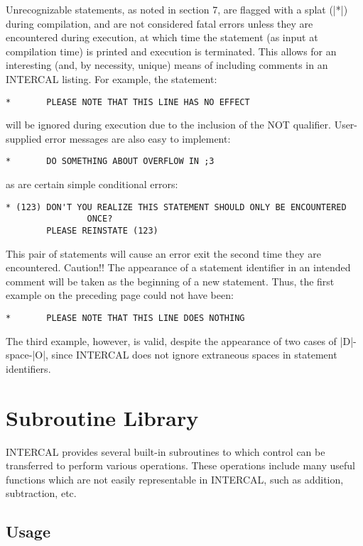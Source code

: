 Unrecognizable statements, as noted in section 7, are flagged with a splat
(|*|) during compilation, and are not considered fatal errors unless they
are encountered during execution, at which time the statement (as input at
compilation time) is printed and execution is terminated.  This allows for
an interesting (and, by necessity, unique) means of including comments in
an INTERCAL listing.  For example, the statement:

\begin{verbatim}
*       PLEASE NOTE THAT THIS LINE HAS NO EFFECT
\end{verbatim}
will be ignored during execution due to the inclusion of the NOT qualifier.
User-supplied error messages are also easy to implement:

\begin{verbatim}
*       DO SOMETHING ABOUT OVERFLOW IN ;3
\end{verbatim}
as are certain simple conditional errors:

\begin{verbatim}
* (123) DON'T YOU REALIZE THIS STATEMENT SHOULD ONLY BE ENCOUNTERED
                ONCE?
        PLEASE REINSTATE (123)
\end{verbatim}
This pair of statements will cause an error exit the second time they are
encountered.  Caution!!  The appearance of a statement identifier in an
intended comment will be taken as the beginning of a new statement.  Thus,
the first example on the preceding page could not have been:

\begin{verbatim}
*       PLEASE NOTE THAT THIS LINE DOES NOTHING
\end{verbatim}
The third example, however, is valid, despite the appearance of two cases
of |D|-space-|O|, since INTERCAL does not ignore extraneous spaces in
statement identifiers.






\section{Subroutine Library}

INTERCAL provides several built-in subroutines to which control can be
transferred to perform various operations.  These operations include many
useful functions which are not easily representable in INTERCAL, such as
addition, subtraction, etc.

\subsection{Usage}

